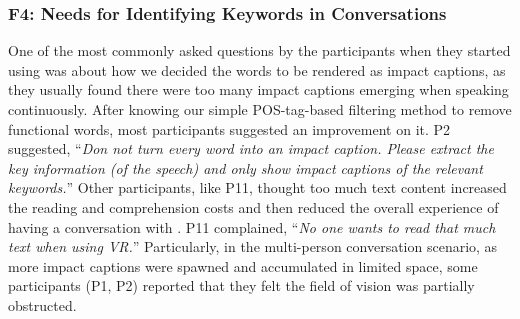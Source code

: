 \subsubsection{F4: Needs for Identifying Keywords in Conversations}
\label{finding_keywords}
One of the most commonly asked questions by the participants when they started using \system{} was about how we decided the words to be rendered as impact captions, as they usually found there were too many impact captions emerging when speaking continuously.
After knowing our simple POS-tag-based filtering method to remove functional words, most participants suggested an improvement on it. 
P2 suggested, ``\textit{Don not turn every word into an impact caption. Please extract the key information (of the speech) and only show impact captions of the relevant keywords.}'' 
Other participants, like P11, thought too much text content increased the reading and comprehension costs and then reduced the overall experience of having a conversation with \system{}. P11 complained, ``\textit{No one wants to read that much text when using VR.}'' 
Particularly, in the multi-person conversation scenario, as more impact captions were spawned and accumulated in limited space, some participants (P1, P2) reported that they felt the field of vision was partially obstructed. 







